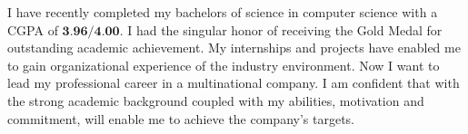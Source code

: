 
I have recently completed my bachelors of science in computer science with a CGPA of $\textbf{3.96/4.00}$. I had the singular honor of receiving the Gold Medal for outstanding academic achievement. My internships and projects have enabled me to gain organizational experience of the industry environment. Now I want to
lead my professional career in a multinational company. I am confident that with the strong academic background coupled with my abilities, motivation and commitment, will enable me to achieve the company's targets.

